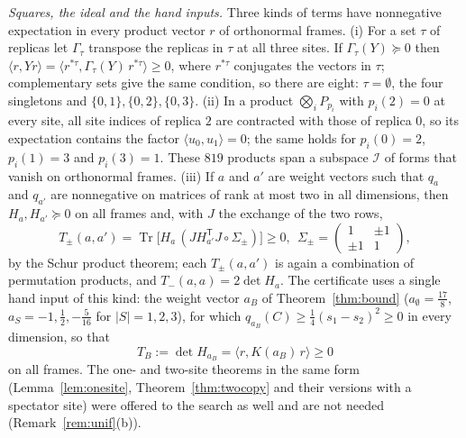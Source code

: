 \documentclass[aps,pra,twocolumn,superscriptaddress,nofootinbib,longbibliography]{revtex4-2}
\newcommand{\ip}[2]{\langle #1,#2\rangle}
\DeclareMathOperator{\Tr}{Tr}
\newcommand{\T}{\mathsf T}
\theoremstyle{plain}
\theoremstyle{definition}
\theoremstyle{remark}
\begin{document}
\emph{Squares, the ideal and the hand inputs.} Three kinds of terms have nonnegative expectation in every product vector $r$ of orthonormal frames. (i) For a set $\tau$ of replicas let $\Gamma_\tau$ transpose the replicas in $\tau$ at all three sites. If $\Gamma_\tau(Y)\succeq0$ then $\ip r{Yr}=\ip{r^{*\tau}}{\Gamma_\tau(Y)\,r^{*\tau}}\ge0$, where $r^{*\tau}$ conjugates the vectors in $\tau$; complementary sets give the same condition, so there are eight: $\tau=\emptyset$, the four singletons and $\{0,1\},\{0,2\},\{0,3\}$. (ii) In a product $\bigotimes_iP_{p_i}$ with $p_i(2)=0$ at every site, all site indices of replica $2$ are contracted with those of replica $0$, so its expectation contains the factor $\ip{u_0}{u_1}=0$; the same holds for $p_i(0)=2$, $p_i(1)=3$ and $p_i(3)=1$. These $819$ products span a subspace $\mathcal I$ of forms that vanish on orthonormal frames. (iii) If $a$ and $a'$ are weight vectors such that $q_a$ and $q_{a'}$ are nonnegative on matrices of rank at most two in all dimensions, then $H_a,H_{a'}\succeq0$ on all frames and, with $J$ the exchange of the two rows,
\begin{equation}\label{eq:hand}
T_\pm(a,a')=\Tr\bigl[H_a\,(JH_{a'}^\T J\circ\Sigma_\pm)\bigr]\ge0,\ \ \Sigma_\pm=\begin{pmatrix}1&\pm1\\\pm1&1\end{pmatrix},
\end{equation}
by the Schur product theorem; each $T_\pm(a,a')$ is again a combination of permutation products, and $T_-(a,a)=2\det H_a$. The certificate uses a single hand input of this kind: the weight vector $a_B$ of Theorem~\ref{thm:bound} ($a_\emptyset=\tfrac{17}8$, $a_S=-1,\tfrac12,-\tfrac5{16}$ for $|S|=1,2,3$), for which $q_{a_B}(C)\ge\tfrac14(s_1-s_2)^2\ge0$ in every dimension, so that
\begin{equation}\label{eq:TB}
T_B:=\det H_{a_B}=\ip r{K(a_B)\,r}\ge0
\end{equation}
on all frames. The one- and two-site theorems in the same form (Lemma~\ref{lem:onesite}, Theorem~\ref{thm:twocopy} and their versions with a spectator site) were offered to the search as well and are not needed (Remark~\ref{rem:unif}(b)).
\end{document}
